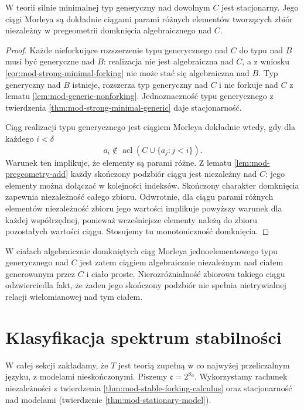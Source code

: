\begin{wniosek}
\label{cor:mod-strong-minimal-morley-sequence}
W teorii silnie minimalnej typ generyczny
nad dowolnym $C$ jest stacjonarny.
Jego ciągi Morleya są dokładnie ciągami
parami różnych elementów tworzących
zbiór niezależny w pregeometrii
domknięcia algebraicznego nad $C$.
\end{wniosek}
\begin{proof}
Każde nieforkujące rozszerzenie typu
generycznego nad $C$ do typu nad $B$
musi być generyczne nad $B$: realizacja
nie jest algebraiczna nad $C$, a z wniosku
\ref{cor:mod-strong-minimal-forking}
nie może stać się algebraiczna nad $B$.
Typ generyczny nad $B$ istnieje,
rozszerza typ generyczny nad $C$
i nie forkuje nad $C$ z lematu
\ref{lem:mod-generic-nonforking}.
Jednoznaczność typu generycznego
z twierdzenia \ref{thm:mod-strong-minimal-generic}
daje stacjonarność.

Ciąg realizacji typu generycznego
jest ciągiem Morleya dokładnie wtedy,
gdy dla każdego $i<\delta$
\[
a_i\notin\operatorname{acl}
(C\cup\{a_j:j<i\}).
\]
Warunek ten implikuje, że elementy
są parami różne. Z lematu
\ref{lem:mod-pregeometry-add}
każdy skończony podzbiór ciągu
jest niezależny nad $C$: jego elementy
można dołączać w kolejności indeksów.
Skończony charakter domknięcia
zapewnia niezależność całego zbioru.
Odwrotnie, dla ciągu parami różnych elementów
niezależność zbioru jego wartości implikuje
powyższy warunek dla każdej współrzędnej,
ponieważ wcześniejsze elementy należą do zbioru
pozostałych wartości ciągu. Stosujemy tu
monotoniczność domknięcia.
\end{proof}

W ciałach algebraicznie domkniętych
ciąg Morleya jednoelementowego typu
generycznego nad $C$ jest zatem ciągiem
algebraicznie niezależnym nad ciałem
generowanym przez $C$ i ciało proste.
Nierozróżnialność zbiorowa takiego ciągu
odzwierciedla fakt, że żaden jego
skończony podzbiór nie spełnia
nietrywialnej relacji wielomianowej
nad tym ciałem.

\section{Klasyfikacja spektrum stabilności}

W całej sekcji zakładamy, że $T$ jest teorią
zupełną w co najwyżej przeliczalnym języku,
z modelami nieskończonymi. Piszemy
$\mathfrak c=2^{\aleph_0}$.
Wykorzystamy rachunek niezależności
z twierdzenia \ref{thm:mod-stable-forking-calculus}
oraz stacjonarność nad modelami
(twierdzenie \ref{thm:mod-stationary-model}).

